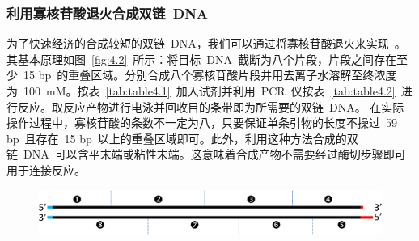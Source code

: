 \subsubsection{利用寡核苷酸退火合成双链\ DNA}\label{subsec:oligoanneal}
为了快速经济的合成较短的双链\ DNA，我们可以通过将寡核苷酸退火来实现\ \citep{Hu2014}。其基本原理如图\ \ref{fig:4.2}\ 所示：将目标\ DNA\ 截断为八个片段，片段之间存在至少\ 15 bp\ 的重叠区域。分别合成八个寡核苷酸片段并用去离子水溶解至终浓度为\ \SI{100}{\milli\nauticalmile}。按表\ \ref{tab:table4.1}\ 加入试剂并利用\ PCR\ 仪按表\ \ref{tab:table4.2}\ 进行反应。取反应产物进行电泳并回收目的条带即为所需要的双链\ DNA。 在实际操作过程中，寡核苷酸的条数不一定为八，只要保证单条引物的长度不操过\ 59 bp\ 且存在\ 15 bp\ 以上的重叠区域即可。此外，利用这种方法合成的双链\ DNA\ 可以含平末端或粘性末端。这意味着合成产物不需要经过酶切步骤即可用于连接反应。
\begin{figure}[t]
\centering
\graphicspath{{figures/}}
\includegraphics[width=\textwidth]{fig4-2.jpg}
{
\par}
\end{figure}

